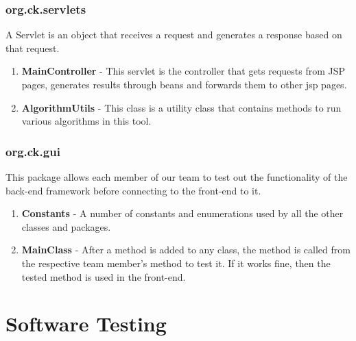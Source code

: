 \documentclass[12pt,a4paper]{report}
\begin{document}
\subsection{org.ck.servlets}

A Servlet is an object that receives a request and generates a response based on that request. 

\begin{enumerate}

\item{\textbf{MainController} - This servlet is the controller that gets requests from JSP pages, generates results through beans and forwards them to other jsp pages.}

\item{\textbf{AlgorithmUtils} - This class is a utility class that contains methods to run various algorithms in this tool.}

\end{enumerate}

\subsection{org.ck.gui}

This package allows each member of our team to test out the functionality of the back-end framework before connecting to the front-end to it.

\begin{enumerate}

\item{\textbf{Constants} - A number of constants and enumerations used by all the other classes and packages.}

\item{\textbf{MainClass} - After a method is added to any class, the method is called from the respective team member's method to test it. If it works fine, then the tested method is used in the front-end.}

\end{enumerate}

\pagestyle{fancy}
\chead{}
\rfoot{\small{\thepage}}
\renewcommand{\headrulewidth}{0.4pt}
\renewcommand{\footrulewidth}{0.4pt}
\chapter{Software Testing}
\end{document}
